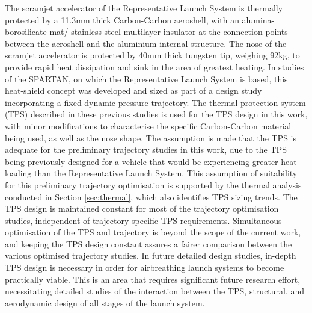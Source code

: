 \noindent
The scramjet accelerator of the Representative Launch System is thermally protected by a 11.3mm thick Carbon-Carbon aeroshell, with an alumina-borosilicate mat/ stainless steel multilayer insulator at the connection points between the aeroshell and the aluminium internal structure\cite{Preller2018a}. The nose of the scramjet accelerator is protected by 40mm thick tungsten tip, weighing 92kg, to provide rapid heat dissipation and sink in the area of greatest heating.
 In studies of the SPARTAN, on which the Representative Launch System is based, this heat-shield concept was developed and sized as part of a design study incorporating a fixed dynamic pressure trajectory\cite{Preller2018a}. 
 The thermal protection system (TPS) described in these previous studies is used for the TPS design in this work, with minor modifications to characterise the specific Carbon-Carbon material being used, as well as the nose shape. The assumption is made that the TPS is adequate for the preliminary trajectory studies in this work, due to the TPS being previously designed for a vehicle that would be experiencing greater heat loading than the Representative Launch System. This assumption of suitability for this preliminary trajectory optimisation is supported by the thermal analysis conducted in Section \ref{sec:thermal}, which also identifies TPS sizing trends.  
  The TPS design is maintained constant for most of the trajectory optimisation studies, independent of trajectory specific TPS requirements. Simultaneous optimisation of the TPS and trajectory is beyond the scope of the current work, and keeping the TPS design constant assures a fairer comparison between the various optimised trajectory studies. 
 In future detailed design studies, in-depth TPS design is necessary in order for airbreathing launch systems to become practically viable. This is an area that requires significant future research effort, necessitating detailed studies of the interaction between the TPS, structural, and aerodynamic design of all stages of the launch system. 


